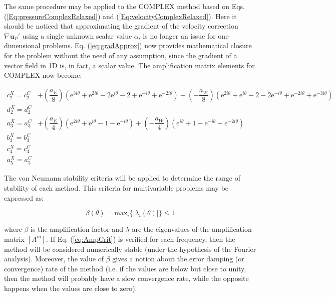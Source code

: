 \documentclass[final,3p,times,11pt,onecolumn]{myElsarticle}
\numberwithin{equation}{section}
\begin{document}
The same procedure may be applied to the COMPLEX method based on Eqs. (\ref{Eq:pressureComplexRelaxed}) and (\ref{Eq:velocityComplexRelaxed}). Here it should be noticed that approximating the gradient of the velocity correction $\nabla \boldsymbol{u}_P'$ using a single unknown scalar value $\alpha$, is no longer an issue for one-dimensional problems. Eq. (\ref{eq:gradApprox}) now provides mathematical closure for the problem without the need of any assumption, since the gradient of a vector field in 1D is, in fact, a scalar value. The amplification matrix elements for COMPLEX now become:

\begin{equation}
\begin{split}
     c^X_2 = c_2^C &+ \left(\dfrac{a_E}{8}\right) \left(\text{e}^{3 i \theta} + \text{e}^{2 i \theta} - 2 \text{e}^{i \theta} - 2 + \text{e}^{-i \theta} + \text{e}^{-2 i \theta}\right) + \left(-\dfrac{a_W}{8}\right) \left(\text{e}^{2 i \theta} + \text{e}^{i \theta} - 2 - 2 \text{e}^{-i \theta} + \text{e}^{-2 i \theta} + \text{e}^{-3 i \theta}\right) \\
     d^X_2 = d^C_2& \\
     a^X_3 = a^C_3 &+ \left(\dfrac{a_E}{4}\right) \left(\text{e}^{2 i \theta} + \text{e}^{i \theta} - 1 - \text{e}^{-i \theta} \right) + \left(-\dfrac{a_W}{4}\right) \left(\text{e}^{i \theta} + 1 - \text{e}^{- i \theta} - \text{e}^{-2 i \theta} \right) \\
     b^X_3 = b_3^C& \\ 
     c^X_4 = c^C_4& \\
     a^X_5 = a^C_5&     
\end{split}
\end{equation}

The von Neumann stability criteria \cite{hirsch} will be applied to determine the range of stability of each method. This criteria for multivariable problems may be expressed as:

\begin{equation}
\beta(\theta) = \text{max}_i \{ |\lambda_i(\theta)| \} \leq 1
\label{eq:AmpCrit}
\end{equation}

\noindent where $\beta$ is the amplification factor and $\lambda$ are the eigenvalues of the amplification matrix $[A^m]$. If Eq. (\ref{eq:AmpCrit}) is verified for each frequency, then the method will be considered numerically stable (under the hypothesis of the Fourier analysis). Moreover, the value of $\beta$ gives a notion about the error damping (or convergence) rate of the method (i.e. if the values are below but close to unity, then the method will probably have a slow convergence rate, while the opposite happens when the values are close to zero).
\end{document}

